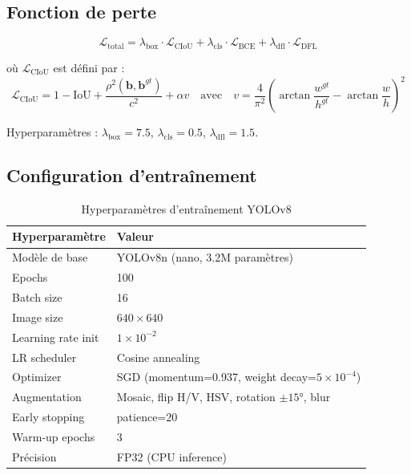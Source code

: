 \documentclass[12pt,a4paper,twoside]{report}
\begin{document}
\subsection{Fonction de perte}

\begin{equation}
\mathcal{L}_\text{total} = \lambda_\text{box}\cdot\mathcal{L}_\text{CIoU}
  + \lambda_\text{cls}\cdot\mathcal{L}_\text{BCE}
  + \lambda_\text{dfl}\cdot\mathcal{L}_\text{DFL}
\label{eq:yolo_loss}
\end{equation}

où $\mathcal{L}_\text{CIoU}$ est défini par :
\begin{equation}
\mathcal{L}_\text{CIoU} = 1 - \text{IoU} + \frac{\rho^2(\mathbf{b}, \mathbf{b}^{gt})}{c^2}
    + \alpha v
  \quad\text{avec}\quad
  v = \frac{4}{\pi^2}\left(\arctan\frac{w^{gt}}{h^{gt}} - \arctan\frac{w}{h}\right)^2
\label{eq:ciou}
\end{equation}

Hyperparamètres : $\lambda_\text{box} = 7.5$, $\lambda_\text{cls} = 0.5$, $\lambda_\text{dfl} = 1.5$.

\subsection{Configuration d'entraînement}

\begin{table}[H]
\centering
\caption{Hyperparamètres d'entraînement YOLOv8}
\label{tab:yolo_hp}
\begin{tabular}{ll}
\toprule
\textbf{Hyperparamètre} & \textbf{Valeur} \\
\midrule
Modèle de base      & YOLOv8n (nano, 3.2M paramètres) \\
Epochs              & 100 \\
Batch size          & 16 \\
Image size          & $640 \times 640$ \\
Learning rate init  & $1\times10^{-2}$ \\
LR scheduler        & Cosine annealing \\
Optimizer           & SGD (momentum=0.937, weight decay=$5\times10^{-4}$) \\
Augmentation        & Mosaic, flip H/V, HSV, rotation $\pm15°$, blur \\
Early stopping      & patience=20 \\
Warm-up epochs      & 3 \\
Précision           & FP32 (CPU inference) \\
\bottomrule
\end{tabular}
\end{table}
\end{document}
